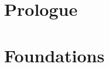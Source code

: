 \documentclass[a4paper,11pt]{memoir}
\newcommand{\note}[1]{\emph{#1}}
\theoremstyle{plain} \newtheorem{id}{Lemma}[chapter]
\theoremstyle{definition} \newtheorem{pr}{Problem}[chapter]
\theoremstyle{remark}\newtheorem{ab}{Remark}[chapter]
\begin{document}
\mainmatter
  \renewcommand{\partnote}{
  This page is intentionally left blank.
  }
  \part{Prologue}
    
    
  \renewcommand{\doublenote}{%
  \note{It takes until January $13^{th}, 2018$ to reach this part.}}
  \part{Foundations}
    
\end{document}

